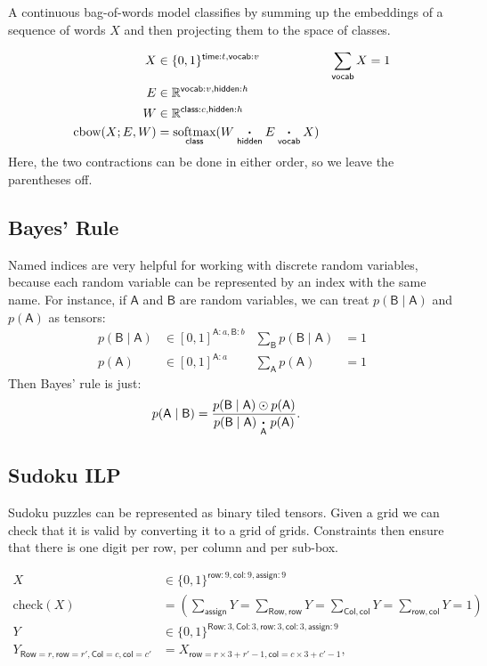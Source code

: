 \documentclass{article}
\newcommand{\name}[1]{\mathsf{#1}}
\newcommand{\nidx}[2]{\name{#1}=#2}
\newcommand{\nset}[2]{\name{#1}:#2}
\newcommand{\ndot}[1]{\mathbin{\mathop{\thinspace\boldsymbol\cdot\thinspace}\limits_{\name{#1}}}}
\newcommand{\nsum}[1]{\mathop{\sum}_{\name{#1}}}
\newcommand{\nfun}[2]{\mathop{\text{#2}}\limits_{\name{#1}}}
\newcommand{\reals}{\mathbb{R}}
\begin{document}
A continuous bag-of-words model classifies by summing up the embeddings of a sequence of words $X$ and then projecting them to the space of classes. 

\begin{align*} 
X &\in \{0, 1\}^{{\nset{time}{t}, \nset{vocab}{v}}} & \nsum{vocab} X &= 1\\
E &\in \reals^{{\nset{vocab}{v}, \nset{hidden}{h}}}\\
W &\in \reals^{{\nset{class}{c}, \nset{hidden}{h}}}\\
\text{cbow}(X; E, W) &= \nfun{class}{softmax} (W \ndot{hidden} E \ndot{vocab} X)
\end{align*}
Here, the two contractions can be done in either order, so we leave the parentheses off.

\subsection{Bayes' Rule}

Named indices are very helpful for working with discrete random variables, because each random variable can be represented by an index with the same name. For instance, if $\name{A}$ and $\name{B}$ are random variables, we can treat $p(\name{B} \mid \name{A})$ and $p(\name{A})$ as tensors:
\begin{align*} 
p(\name{B} \mid \name{A}) &\in [0, 1]^{\nset{A}{a}, \nset{B}{b}} & \nsum{B} p(\name{B}\mid \name{A}) &= 1 \\
p(\name{A}) &\in [0, 1]^{\nset{A}{a}} & \nsum{A} p(\name{A}) &= 1
\end{align*}
Then Bayes' rule is just:
\begin{align*}
p(\name{A} \mid \name{B}) &= \frac{p(\name{B} \mid \name{A}) \odot p(\name{A})}{p(\name{B} \mid \name{A}) \ndot{A} p(\name{A})}.
\end{align*}

\subsection{Sudoku ILP}

Sudoku puzzles can be represented as  binary tiled tensors.
Given a grid we can check that it is valid by converting it to a grid of grids. 
Constraints then ensure that there is one digit per row, per column and per sub-box. 

\begin{align*} 
X &\in \{0, 1\}^{\nset{row}{9}, \nset{col}{9}, \nset{assign}{9}}  \\
\text{check}(X) &=
\left(\nsum{assign} Y = 
\nsum{Row,row} Y = 
\nsum{Col, col} Y =  
\nsum{row, col} Y = 1 \right) \\
Y &\in \{0, 1\}^{\nset{Row}{3}, \nset{Col}{3}, \nset{row}{3}, \nset{col}{3}, \nset{assign}{9}}  \\
Y_{\nidx{Row}{r}, \nidx{row}{r'}, \nidx{Col}{c}, \nidx{col}{c'}} &= X_{\nidx{row}{r\times 3 + r'-1}, \nidx{col}{c\times3 + c'-1}}, 
\end{align*} 
\end{document}
